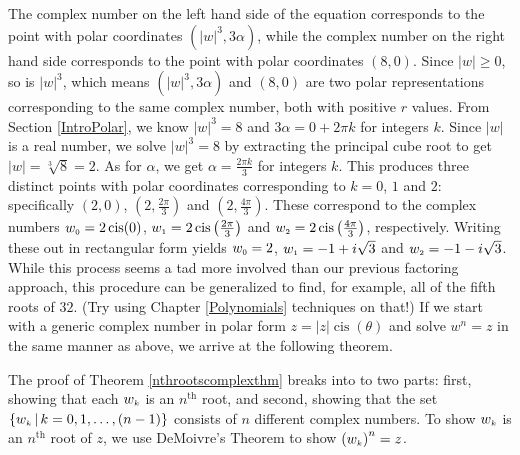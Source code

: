 The complex number on the left hand side of the equation corresponds to the point with polar coordinates $\left(|w|^3, 3\alpha\right)$,   while the complex number on the right hand side corresponds to the point with polar coordinates $(8,0)$.  Since $|w| \geq 0$, so is $|w|^3$, which means  $\left(|w|^3, 3\alpha\right)$ and $(8,0)$ are two polar representations corresponding to the same complex number, both with positive $r$ values.  From Section \ref{IntroPolar}, we know $|w|^3 = 8$ and $3\alpha = 0 + 2\pi k$ for integers $k$.  Since $|w|$ is a real number, we solve $|w|^3 = 8$ by extracting the principal cube root to get  $|w| = \sqrt[3]{8} = 2$.  As for $\alpha$, we get  $\alpha = \frac{2\pi k}{3}$ for integers $k$.  This produces three distinct points with polar coordinates corresponding to $k = 0$, $1$ and $2$: specifically $(2,0)$, $\left(2, \frac{2\pi}{3}\right)$ and $\left(2, \frac{4\pi}{3}\right)$.  These correspond to the complex numbers  $w_{\text{\tiny $0$}} = 2 \operatorname{cis}(0)$, $w_{\text{\tiny $1$}} = 2 \operatorname{cis}\left(\frac{2\pi}{3}\right)$ and $w_{\text{\tiny $2$}} = 2 \operatorname{cis}\left(\frac{4\pi}{3}\right)$, respectively.  Writing these out in rectangular form yields $w_{\text{\tiny $0$}} = 2$, $w_{\text{\tiny $1$}} = -1 + i\sqrt{3}$ and $w_{\text{\tiny $2$}} = -1-i\sqrt{3}$. While this process seems a tad more involved than our previous factoring approach, this procedure can be generalized to find, for example, all of the fifth roots of $32$. (Try using Chapter \ref{Polynomials} techniques on that!) If we start with a generic complex number in polar form $z = |z| \operatorname{cis}(\theta)$ and solve $w^{n} = z$ in the same manner as above, we arrive at the following theorem.

\smallskip


\smallskip

The proof of Theorem \ref{nthrootscomplexthm} breaks into to two parts:  first, showing that each $w_{\text{\tiny$k$}}$ is an $n^{\text{th}}$ root, and second, showing that the set  $\left\{ w_{\text{\tiny$k$}} \, | \, k = 0, 1, \ldots, (n-1)\right\}$ consists of $n$ different  complex numbers.  To show $w_{\text{\tiny$k$}}$ is an  $n^{\text{th}}$ root of $z$, we use DeMoivre's Theorem to show $\left(w_{\text{\tiny$k$}}\right)^n = z$.

